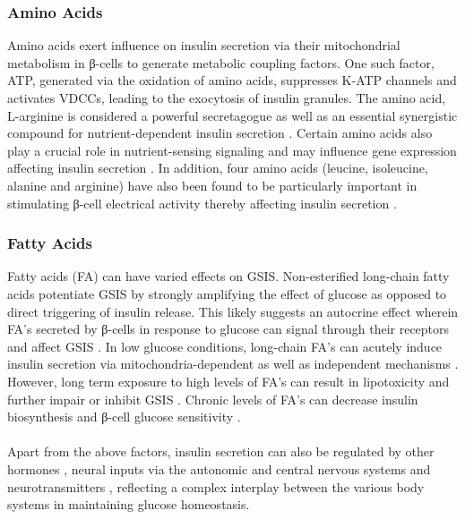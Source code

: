 \subsubsection{Amino Acids}
Amino acids exert influence on insulin secretion via their mitochondrial metabolism in β-cells to generate metabolic coupling factors. One such factor, ATP, generated via the oxidation of amino acids, suppresses K-ATP channels and activates VDCCs, leading to the exocytosis of insulin granules. The amino acid, L-arginine is considered a powerful secretagogue as well as an essential synergistic compound for nutrient-dependent insulin secretion \textbf{\cite{newsholme_nutritional_2012}}. Certain amino acids also play a crucial role in nutrient-sensing signaling \textbf{\cite{newsholme_nutritional_2012}} and may influence gene expression affecting insulin secretion \textbf{\cite{newsholme_amino_2006}}. In addition, four amino acids (leucine, isoleucine, alanine and arginine) have also been found to be particularly important in stimulating β-cell electrical activity thereby affecting insulin secretion \textbf{\cite{newsholme_amino_2006}}. 

\subsubsection{Fatty Acids}
Fatty acids (FA) can have varied effects on GSIS. Non-esterified long-chain fatty acids potentiate GSIS by strongly amplifying the effect of glucose as opposed to direct triggering of insulin release. This likely suggests an autocrine effect wherein FA’s secreted by β-cells in response to glucose can signal through their receptors and affect GSIS \textbf{\cite{poitout_fatty_2018}}. In low glucose conditions, long-chain FA's can acutely induce insulin secretion via mitochondria-dependent as well as independent mechanisms \textbf{\cite{cen_fatty_2016}}. However, long term exposure to high levels of FA’s can result in lipotoxicity and further impair or inhibit GSIS \textbf{\cite{jezek_fatty_2018}}. Chronic levels of FA’s can decrease insulin biosynthesis and β-cell glucose sensitivity \textbf{\cite{chueire_effect_2020}}. 
\\\\
Apart from the above factors, insulin secretion can also be regulated by other hormones \textbf{\cite{cheng_follicle-stimulating_2023}}, neural inputs via the autonomic \textbf{\cite{thorens_brain_2011, komatsu_glucosestimulated_2013}} and central nervous systems \textbf{\cite{ruud_neuronal_2017}} and neurotransmitters \textbf{\cite{rodriguez-diaz_neurotransmitters_2014}}, reflecting a complex interplay between the various body systems in maintaining glucose homeostasis. 


